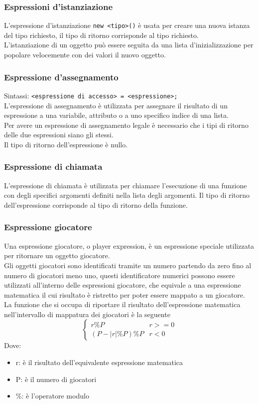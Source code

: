 \subsubsection{Espressioni d'istanziazione}
L'espressione d'istanziazione \verb|new <tipo>()| è usata per creare una nuova istanza del tipo
richiesto, il tipo di ritorno corrisponde al tipo richiesto.
\\
L'istanziazione di un oggetto può essere seguita da una lista d'inizializzazione per popolare 
velocemente con dei valori il nuovo oggetto.

\subsubsection{Espressione d'assegnamento}
Sintassi: \verb|<espressione di accesso> = <espressione>;| \\
L'espressione di assegnamento è utilizzata per assegnare il risultato di un espressione
a una variabile, attributo o a uno specifico indice di una lista. \\
Per avere un espressione di assegnamento legale è necessario che i tipi di ritorno
delle due espressioni siano gli stessi. \\
Il tipo di ritorno dell'espressione è nullo.

\subsubsection{Espressione di chiamata}
L'espressione di chiamata è utilizzata per chiamare l'esecuzione di una funzione 
con degli specifici argomenti definiti nella lista degli argomenti.
Il tipo di ritorno dell'espressione corrisponde al tipo di ritorno della funzione.

\subsubsection{Espressione giocatore}
Una espressione giocatore, o player expression, è un espressione speciale utilizzata per ritornare 
un oggetto giocatore. 
\\
Gli oggetti giocatori sono identificati tramite un numero partendo da zero fino al numero di giocatori meno uno,
questi identificatore numerici possono essere utilizzati all'interno delle espressioni giocatore, che equivale 
a una espressione matematica il cui risultato è ristretto per poter essere mappato a un giocatore.
\\
La funzione che si occupa di riportare il risultato dell'espressione matematica nell'intervallo di 
mappatura dei giocatori è la seguente
\[
\begin{cases}
    r \% P  & r >= 0 \\
    (P - |r| \% P) \% P & r < 0
\end{cases}
\] 
Dove:
\begin{itemize}
    \item r: è il risultato dell'equivalente espressione matematica
    \item P: è il numero di giocatori
    \item \%: è l'operatore modulo
\end{itemize}

